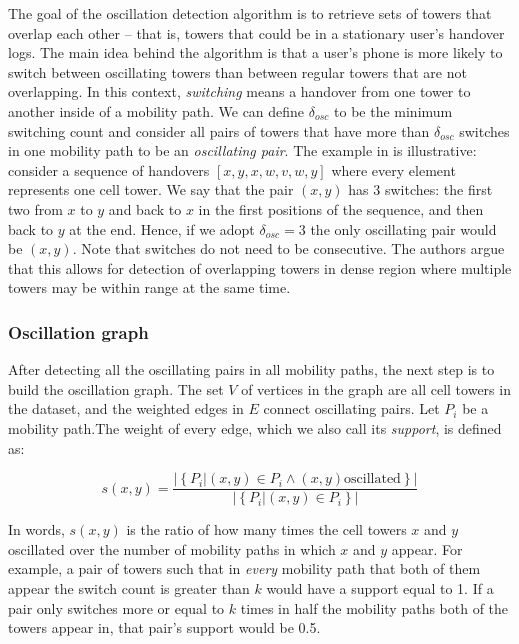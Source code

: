 \documentclass[letterpaper, 12pt, conference]{ieeeconf}
\begin{document}
The goal of the oscillation detection algorithm is to retrieve sets of towers 
that overlap each other -- that is, towers that could be in a stationary 
user's handover logs. The main idea behind the algorithm is that a user's 
phone is more likely to switch between oscillating towers than between 
regular towers that are not overlapping. In this context, \textit{switching} 
means a handover from one tower to another inside of a mobility path. We can 
define $\delta_{osc}$ to be the minimum switching count and consider all 
pairs of towers that have more than $\delta_{osc}$ switches in one mobility 
path to be an \textit{oscillating pair}. The example in \cite{mobilityprofiler}
is illustrative: consider a sequence of handovers $\left[x, y, x, w, v, w, y
\right]$ where every element represents one cell tower. We say that the pair $
(x, y)$ has 3 switches: the first two from $x$ to $y$ and back to $x$ in the 
first positions of the sequence, and then back to $y$ at the end. Hence, if 
we adopt $\delta_{osc}=3$ the only oscillating pair would be $(x, y)$. Note 
that switches do not need to be consecutive. The authors argue that this 
allows for detection of overlapping towers in dense region where multiple 
towers may be within range at the same time.

\subsubsection{Oscillation graph}

After detecting all the oscillating pairs in all mobility paths, the next 
step is to build the oscillation graph. The set $V$ of vertices in the graph 
are all cell towers in the dataset, and the weighted edges in $E$ connect 
oscillating pairs. Let $P_i$ be a mobility path.The weight of every edge, 
which we also call its \textit{support}, is defined as:

\begin{equation*}
s(x,y) = \frac{|\left\{P_i| (x, y) \in P_i \wedge (x, y) \text{oscillated}
\right\}|}{|\left\{P_i| (x, y) \in P_i\right\}|}
\end{equation*}

In words, $s(x,y)$ is the ratio of how many times the cell towers $x$ and $y$ 
oscillated over the number of mobility paths in which $x$ and $y$ appear. For 
example, a pair of towers such that in \textit{every} mobility path that both 
of them appear the switch count is greater than $k$ would have a support 
equal to 1. If a pair only switches more or equal to $k$ times in half the 
mobility paths both of the towers appear in, that pair's support would be 0.5.
\end{document}
